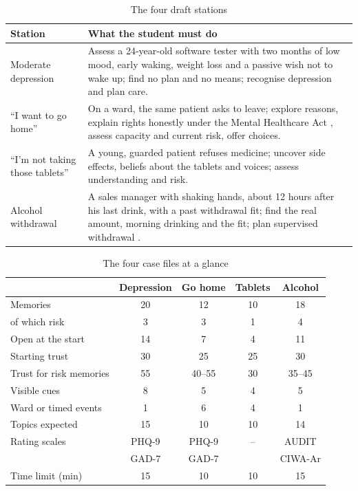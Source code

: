 \documentclass{article}
\begin{document}
\begin{table}[t]
\caption{The four draft stations}
\label{tab:stations}
\centering
\scriptsize
\begin{tabular}{ll}
\toprule
Station & What the student must do\\
\midrule
Moderate depression & Assess a 24-year-old software tester with two months of low mood, early waking, weight loss and a passive wish not to wake up; find no
plan and no means; recognise depression and plan care.\\
``I want to go home'' & On a ward, the same patient asks to leave; explore reasons, explain rights honestly under the Mental Healthcare Act
\cite{mhca2017}, assess capacity and current risk, offer choices.\\
``I'm not taking those tablets'' & A young, guarded patient refuses medicine; uncover side effects, beliefs about the tablets and voices; assess
understanding and risk.\\
Alcohol withdrawal & A sales manager with shaking hands, about 12 hours after his last drink, with a past withdrawal fit; find the real amount, morning
drinking and the fit; plan supervised withdrawal \cite{nice2010cg100}.\\
\bottomrule
\end{tabular}
\end{table}

\begin{table}[t]
\caption{The four case files at a glance}
\label{tab:casestats}
\centering
\scriptsize

\begin{tabular}{@{}lcccc@{}}
\toprule
& Depression & Go home & Tablets & Alcohol\\
\midrule
Memories & 20 & 12 & 10 & 18\\
\quad of which risk & 3 & 3 & 1 & 4\\
Open at the start & 14 & 7 & 4 & 11\\
Starting trust & 30 & 25 & 25 & 30\\
Trust for risk memories & 55 & 40--55 & 30 & 35--45\\
Visible cues & 8 & 5 & 4 & 5\\
Ward or timed events & 1 & 6 & 4 & 1\\
Topics expected & 15 & 10 & 10 & 14\\
Rating scales & PHQ-9 & PHQ-9 & -- & AUDIT\\
& GAD-7 & GAD-7 & & CIWA-Ar\\
Time limit (min) & 15 & 10 & 10 & 15\\
\bottomrule
\end{tabular}
\end{table}
\end{document}
